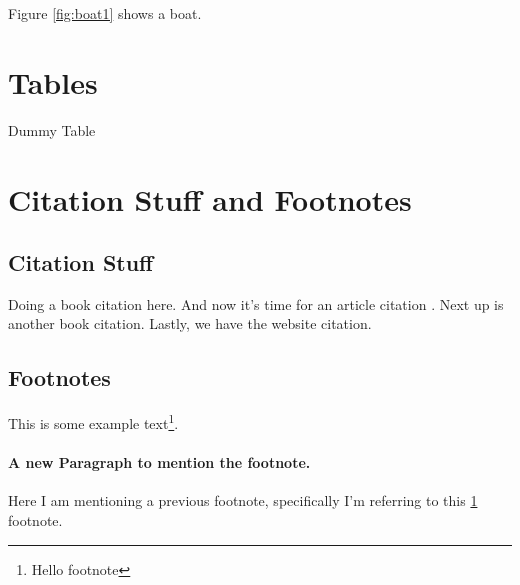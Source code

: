 \documentclass{article}
\begin{document}
    Figure \ref{fig:boat1} shows a boat.

  \section{Tables}
    \begin{table}
      \caption{Dummy Table}
    \end{table}

  \section{Citation Stuff and Footnotes}
    \subsection{Citation Stuff}
    Doing a book citation \autocite[31]{BOOK:1} here.
    And now it's time for an article citation \autocite[697]{ARTICLE:1}.
    Next up is another book \autocite[155]{BOOK:2} citation.
    Lastly, we have the website \autocite[]{WEBSITE:1} citation.

    \subsection{Footnotes}
    This is some example text\footnote{\label{myfootnote}Hello footnote}.

    \paragraph{A new Paragraph to mention the footnote.}
    Here I am mentioning a previous footnote, specifically I'm referring to this \ref{myfootnote} footnote.


  \newpage
  \printbibliography

  \newpage
  \newpage
  \begin{appendix}
    \listoffigures
    \listoftables
  \end{appendix}
\end{document}
